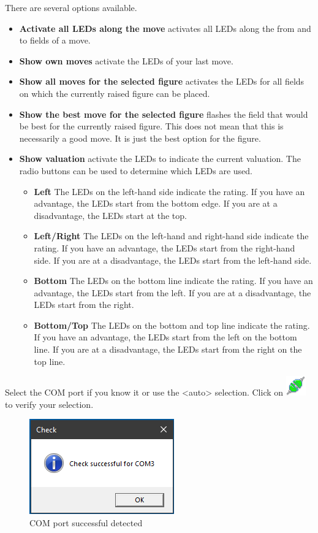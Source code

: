 \documentclass[11pt,a4paper]{article}
\begin{document}
There are several options available.
\begin{itemize}
	\item \textbf{Activate all LEDs along the move} activates all LEDs along the from and to fields of a move.
	\item \textbf{Show own moves} activate the LEDs of your last move.
	\item \textbf{Show all moves for the selected figure} activates the LEDs for all fields on which the currently raised figure can be placed.
	\item \textbf{Show the best move for the selected figure} flashes the field that would be best for the currently raised figure. This does not mean that this is necessarily a good move. It is just the best option for the figure.
	\item \textbf{Show valuation} activate the LEDs to indicate the current valuation. The radio buttons can be used to determine which LEDs are used.
	\begin{itemize}
		\item \textbf{Left} The LEDs on the left-hand side indicate the rating. If you have an advantage, the LEDs start from the bottom edge. If you are at a disadvantage, the LEDs start at the top.
		\item \textbf{Left/Right} The LEDs on the left-hand and right-hand side indicate the rating. If you have an advantage, the LEDs start from the right-hand side. If you are at a disadvantage, the LEDs start from the left-hand side.
		\item \textbf{Bottom} The LEDs on the bottom line indicate the rating. If you have an advantage, the LEDs start from the left. If you are at a disadvantage, the LEDs start from the right.
		\item \textbf{Bottom/Top} The LEDs on the bottom and top line indicate the rating. If you have an advantage, the LEDs start from the left on the bottom line. If you are at a disadvantage, the LEDs start from the right on the top line.		
	\end{itemize}
\end{itemize}

Select the COM port if you know it or use the <auto> selection.
Click on \includegraphics[scale=0.5]{connect.png} to verify your selection.

\begin{figure}[H]
	\centering
	\includegraphics[scale=1.0]{MillenniumChessLink3.png}
	\caption{COM port successful detected }
	\label{fig:MillenniumChessLink3}
\end{figure}
\end{document}
